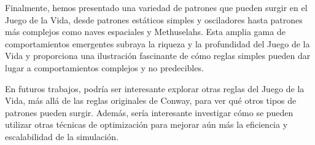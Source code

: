 \documentclass[]{article}
\begin{document}
Finalmente, hemos presentado una variedad de patrones que pueden surgir en el Juego de la Vida, desde patrones estáticos simples y osciladores hasta patrones más complejos como naves espaciales y Methuselahs. Esta amplia gama de comportamientos emergentes subraya la riqueza y la profundidad del Juego de la Vida y proporciona una ilustración fascinante de cómo reglas simples pueden dar lugar a comportamientos complejos y no predecibles.

En futuros trabajos, podría ser interesante explorar otras reglas del Juego de la Vida, más allá de las reglas originales de Conway, para ver qué otros tipos de patrones pueden surgir. Además, sería interesante investigar cómo se pueden utilizar otras técnicas de optimización para mejorar aún más la eficiencia y escalabilidad de la simulación.
\end{document}
